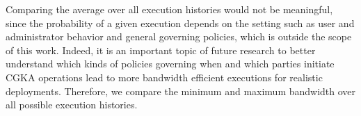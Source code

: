 

Comparing the average over all execution histories would not be meaningful, since the probability of a given execution depends on the setting such as user and administrator behavior and general
governing policies, which is outside the
scope of this work. Indeed, it is an important topic of future research to
better understand which kinds of policies governing when and which parties
initiate CGKA operations lead to more bandwidth efficient executions for
realistic deployments. Therefore, we compare the minimum and maximum bandwidth over all possible execution histories.


%



